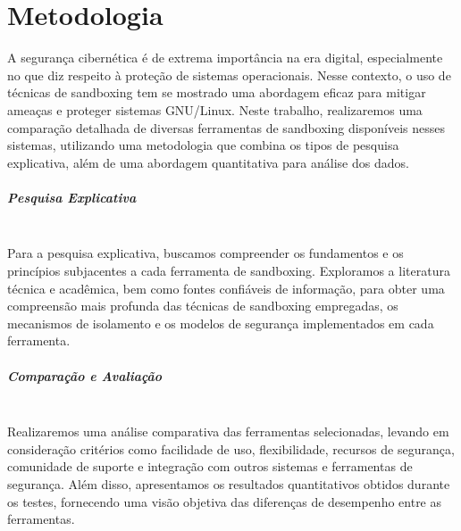 \chapter{Metodologia}

A segurança cibernética é de extrema importância na era digital, especialmente no que diz respeito à proteção de sistemas operacionais. Nesse contexto, o uso de técnicas de sandboxing tem se mostrado uma abordagem eficaz para mitigar ameaças e proteger sistemas GNU/Linux. Neste trabalho, realizaremos uma comparação detalhada de diversas ferramentas de sandboxing disponíveis nesses sistemas, utilizando uma metodologia que combina os tipos de pesquisa explicativa, além de uma abordagem quantitativa para análise dos dados.

\paragraph*{Pesquisa Explicativa} \mbox{}\\
Para a pesquisa explicativa, buscamos compreender os fundamentos e os princípios subjacentes a cada ferramenta de sandboxing. Exploramos a literatura técnica e acadêmica, bem como fontes confiáveis de informação, para obter uma compreensão mais profunda das técnicas de sandboxing empregadas, os mecanismos de isolamento e os modelos de segurança implementados em cada ferramenta.


\paragraph*{Comparação e Avaliação} \mbox{}\\
 Realizaremos uma análise comparativa das ferramentas selecionadas, levando em consideração critérios como facilidade de uso, flexibilidade, recursos de segurança, comunidade de suporte e integração com outros sistemas e ferramentas de segurança. Além disso, apresentamos os resultados quantitativos obtidos durante os testes, fornecendo uma visão objetiva das diferenças de desempenho entre as ferramentas.

